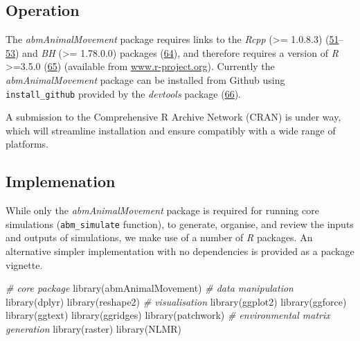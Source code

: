 \documentclass[10pt,a4paper]{article}
\newenvironment{Shaded}{}{}
\newcommand{\CommentTok}[1]{\textit{#1}}
\newcommand{\FunctionTok}[1]{#1}
\newcommand{\NormalTok}[1]{#1}
\begin{document}
\hypertarget{operation}{%
\subsection{Operation}\label{operation}}

The \emph{abmAnimalMovement} package requires links to the \emph{Rcpp} (\textgreater= 1.0.8.3) (\protect\hyperlink{ref-Eddelbuettel_seamless_2011}{51}--\protect\hyperlink{ref-Eddelbuettel_extending_2018}{53}) and \emph{BH} (\textgreater= 1.78.0.0) packages (\protect\hyperlink{ref-Eddelbuettel_BH_2021}{64}), and therefore requires a version of \emph{R} \textgreater=3.5.0 (\protect\hyperlink{ref-R-base}{65}) (available from \href{https://www.r-project.org/}{www.r-project.org}).
Currently the \emph{abmAnimalMovement} package can be installed from Github using \texttt{install\_github} provided by the \emph{devtools} package (\protect\hyperlink{ref-Wickham_devtools_2021}{66}).

A submission to the Comprehensive R Archive Network (CRAN) is under way, which will streamline installation and ensure compatibly with a wide range of platforms.

\hypertarget{implemenation}{%
\subsection{Implemenation}\label{implemenation}}

While only the \emph{abmAnimalMovement} package is required for running core simulations (\texttt{abm\_simulate} function), to generate, organise, and review the inputs and outputs of simulations, we make use of a number of \emph{R} packages.
An alternative simpler implementation with no dependencies is provided as a package vignette.

\begin{Shaded}
\begin{Highlighting}[]
\CommentTok{\# core package}
\FunctionTok{library}\NormalTok{(abmAnimalMovement)}
\CommentTok{\# data manipulation}
\FunctionTok{library}\NormalTok{(dplyr)}
\FunctionTok{library}\NormalTok{(reshape2)}
\CommentTok{\# visualisation}
\FunctionTok{library}\NormalTok{(ggplot2)}
\FunctionTok{library}\NormalTok{(ggforce)}
\FunctionTok{library}\NormalTok{(ggtext)}
\FunctionTok{library}\NormalTok{(ggridges)}
\FunctionTok{library}\NormalTok{(patchwork)}
\CommentTok{\# environmental matrix generation}
\FunctionTok{library}\NormalTok{(raster)}
\FunctionTok{library}\NormalTok{(NLMR)}
\end{Highlighting}
\end{Shaded}
\end{document}
